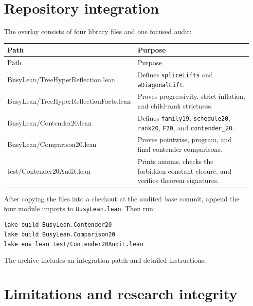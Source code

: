 \documentclass[11pt]{article}
\theoremstyle{definition}
\newcommand{\code}[1]{\texttt{#1}}
\begin{document}
\section{Repository integration}

The overlay consists of four library files and one focused audit:
\begin{longtable}{@{}>{\ttfamily\footnotesize\raggedright\arraybackslash}p{}p{}@{}}
\toprule
Path & Purpose \\
\midrule
\endfirsthead
\toprule
Path & Purpose \\
\midrule
\endhead
BusyLean/TreeHyperReflection.lean & Defines \code{spliceLifts} and \code{wDiagonalLift}. \\
BusyLean/TreeHyperReflectionFacts.lean & Proves progressivity, strict inflation, and child-rank strictness. \\
BusyLean/Contender20.lean & Defines \code{family19}, \code{schedule20}, \code{rank20}, \code{F20}, and \code{contender\_20}. \\
BusyLean/Comparison20.lean & Proves pointwise, program, and final contender comparisons. \\
test/Contender20Audit.lean & Prints axioms, checks the forbidden-constant closure, and verifies theorem signatures. \\
\bottomrule
\end{longtable}

After copying the files into a checkout at the audited base commit, append the
four module imports to \code{BusyLean.lean}.  Then run:
\begin{lstlisting}[language=bash]
lake build BusyLean.Contender20
lake build BusyLean.Comparison20
lake env lean test/Contender20Audit.lean
\end{lstlisting}
The archive includes an integration patch and detailed instructions.

\section{Limitations and research integrity}
\end{document}

